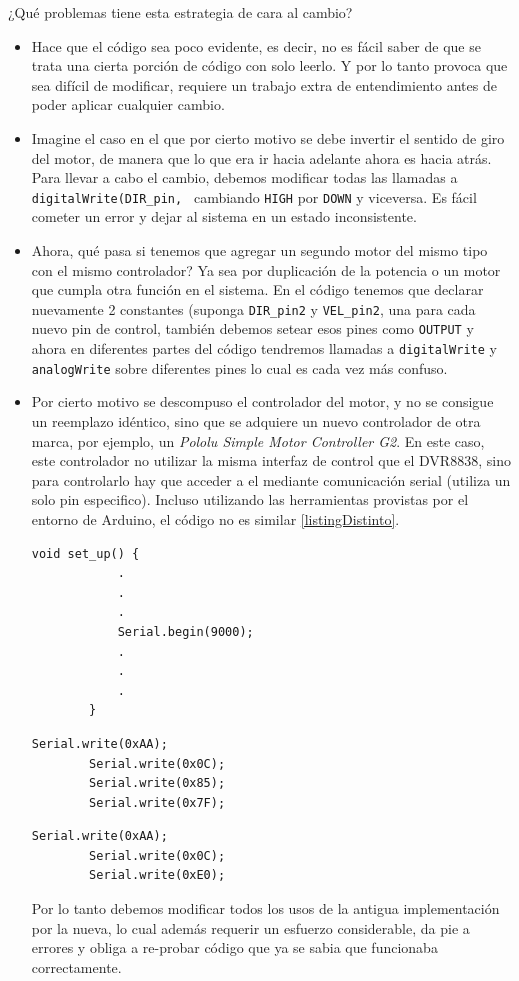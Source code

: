 ¿Qué problemas tiene esta estrategia de cara al cambio?
\begin{itemize}
    \item Hace que el código sea poco evidente, es decir, no es fácil saber de que se trata una cierta porción de código con solo leerlo. Y por lo tanto provoca que sea difícil de modificar, requiere un trabajo extra de entendimiento antes de poder aplicar cualquier cambio.
    \item Imagine el caso en el que por cierto motivo se debe invertir el sentido de giro del motor, de manera que lo que era ir hacia adelante ahora es hacia atrás. Para llevar a cabo el cambio, debemos modificar todas las llamadas a \verb|digitalWrite(DIR_pin, | cambiando \verb|HIGH| por \verb|DOWN| y viceversa. Es fácil cometer un error y dejar al sistema en un estado inconsistente.
    \item Ahora, qué pasa si tenemos que agregar un segundo motor del mismo tipo con el mismo controlador? Ya sea por duplicación de la potencia o un motor que cumpla otra función en el sistema. En el código tenemos que declarar nuevamente 2 constantes (suponga \verb|DIR_pin2| y \verb|VEL_pin2|, una para cada nuevo pin de control, también debemos setear esos pines como \verb|OUTPUT| y ahora en diferentes partes del código tendremos llamadas a \verb|digitalWrite| y \verb|analogWrite| sobre diferentes pines lo cual es cada vez más confuso.
    \item Por cierto motivo se descompuso el controlador del motor, y no se consigue un reemplazo idéntico, sino que se adquiere un nuevo controlador de otra marca, por ejemplo, un \textit{Pololu Simple Motor Controller G2}. En este caso, este controlador no utilizar la misma interfaz de control que el DVR8838, sino para controlarlo hay que acceder a el mediante comunicación serial (utiliza un solo pin especifico). Incluso utilizando las herramientas provistas por el entorno de Arduino, el código no es similar \ref{listingDistinto}.
    \begin{lstlisting}[caption=Configuración, label={listingDistinto}]
        void set_up() {
            .
            .
            .
            Serial.begin(9000);
            .
            .
            .
        }
    \end{lstlisting}
    \begin{lstlisting}[caption=Máxima velocidad giro horario]
        Serial.write(0xAA);
        Serial.write(0x0C);
        Serial.write(0x85);
        Serial.write(0x7F);
    \end{lstlisting}
    \begin{lstlisting}[caption=Detenerse]
        Serial.write(0xAA);
        Serial.write(0x0C);
        Serial.write(0xE0);
    \end{lstlisting}
    Por lo tanto debemos modificar todos los usos de la antigua implementación por la nueva, lo cual además requerir un esfuerzo considerable, da pie a errores y obliga a re-probar código que ya se sabia que funcionaba correctamente.
\end{itemize}

